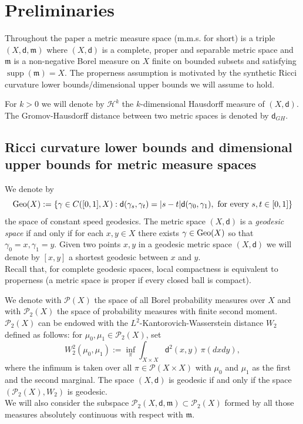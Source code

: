\documentclass[a4paper]{amsart}
\newcounter{assu}
\theoremstyle{plain}
\theoremstyle{definition}
\numberwithin{equation}{section}
\newcommand{\Geo}{{\rm Geo}}
\newcommand{\mm}{\mathfrak m}
\newcommand{\sfd}{\mathsf d}
\newcommand{\cH}{\mathcal{H}}
\DeclareMathOperator{\supp}{supp}
\begin{document}
{{}



\section{Preliminaries}
{
Throughout the paper a metric measure space (m.m.s. for short) is a  triple $(X,\sfd,\mm)$ where $(X,\sfd)$ is a complete, proper and separable metric space and $\mm$ is a non-negative Borel measure on $X$ finite on bounded subsets and satisfying $\supp(\mm)=X$.  The properness assumption is motivated by the synthetic Ricci curvature lower bounds/dimensional upper bounds we will assume to hold. 

For $k>0$ we will denote  by $\cH^{k}$ the $k$-dimensional Hausdorff measure of $(X,\sfd)$.  The Gromov-Hausdorff distance between two metric spaces is denoted by $\sfd_{GH}$.

\subsection{Ricci curvature lower bounds and dimensional upper bounds for  metric measure spaces}\label{SS:RCDDef}



We denote by 
$$
\Geo(X) : = \{ \gamma \in C([0,1], X):  \sfd(\gamma_{s},\gamma_{t}) = |s-t| \sfd(\gamma_{0},\gamma_{1}), \text{ for every } s,t \in [0,1] \}
$$
the space of constant speed geodesics. The metric space $(X,\sfd)$ is a \emph{geodesic space} if and only if for each $x,y \in X$ 
there exists $\gamma \in \Geo(X)$ so that $\gamma_{0} =x, \gamma_{1} = y$. Given two points $x,y$ in  a geodesic metric space $(X, \sfd)$ we will denote by $[x,y]$ a shortest geodesic between $x$ and $y$.
\\Recall that, for complete geodesic spaces, local compactness is equivalent to properness (a metric space is proper if every closed ball is compact).

\medskip

We denote with  $\mathcal{P}(X)$ the  space of all Borel probability measures over $X$ and with  $\mathcal{P}_{2}(X)$ the space of probability measures with finite second moment.
$\mathcal{P}_{2}(X)$ can be  endowed with the $L^{2}$-Kantorovich-Wasserstein distance  $W_{2}$ defined as follows:  for $\mu_0,\mu_1 \in \mathcal{P}_{2}(X)$,  set
%
\begin{equation}\label{eq:W2def}
  W_2^2(\mu_0,\mu_1) := \inf_{ \pi} \int_{X\times X} \sfd^2(x,y) \, \pi(dxdy),
\end{equation}
%
where the infimum is taken over all $\pi \in \mathcal{P}(X \times X)$ with $\mu_0$ and $\mu_1$ as the first and the second marginal.
The space $(X,\sfd)$ is geodesic  if and only if the space $(\mathcal{P}_2(X), W_2)$ is geodesic. 
\\We will also consider the subspace $\mathcal{P}_{2}(X,\sfd,\mm)\subset \mathcal{P}_{2}(X)$
formed by all those measures absolutely continuous with respect with $\mm$.
\medskip

}}
\end{document}
